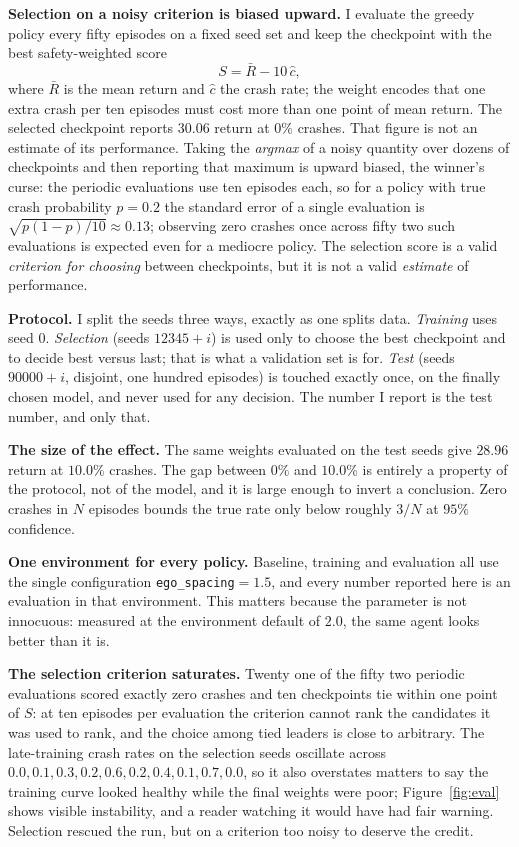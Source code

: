 \documentclass{article}
\newcommand{\agentmean}{28.96}
\newcommand{\agentcrash}{10.0}
\newcommand{\selmean}{30.06}
\newcommand{\selcrash}{0}
\begin{document}
\textbf{Selection on a noisy criterion is biased upward.} I evaluate the greedy policy every fifty episodes on a fixed seed set and keep the checkpoint with the best safety-weighted score
\begin{equation}
S=\bar R-10\,\hat c,
\label{eq:score}
\end{equation}
where $\bar R$ is the mean return and $\hat c$ the crash rate; the weight encodes that one extra crash per ten episodes must cost more than one point of mean return. The selected checkpoint reports $\selmean$ return at $\selcrash\%$ crashes. That figure is not an estimate of its performance. Taking the \emph{argmax} of a noisy quantity over dozens of checkpoints and then reporting that maximum is upward biased, the winner's curse: the periodic evaluations use ten episodes each, so for a policy with true crash probability $p{=}0.2$ the standard error of a single evaluation is $\sqrt{p(1-p)/10}\approx0.13$; observing zero crashes once across fifty two such evaluations is expected even for a mediocre policy. The selection score is a valid \emph{criterion for choosing} between checkpoints, but it is not a valid \emph{estimate} of performance.

\textbf{Protocol.} I split the seeds three ways, exactly as one splits data. \emph{Training} uses seed 0. \emph{Selection} (seeds $12345{+}i$) is used only to choose the best checkpoint and to decide best versus last; that is what a validation set is for. \emph{Test} (seeds $90000{+}i$, disjoint, one hundred episodes) is touched exactly once, on the finally chosen model, and never used for any decision. The number I report is the test number, and only that.

\textbf{The size of the effect.} The same weights evaluated on the test seeds give $\agentmean$ return at $\agentcrash\%$ crashes. The gap between $\selcrash\%$ and $\agentcrash\%$ is entirely a property of the protocol, not of the model, and it is large enough to invert a conclusion. Zero crashes in $N$ episodes bounds the true rate only below roughly $3/N$ at $95\%$ confidence.

\textbf{One environment for every policy.} Baseline, training and evaluation all use the single configuration \texttt{ego\_spacing}${=}1.5$, and every number reported here is an evaluation in that environment. This matters because the parameter is not innocuous: measured at the environment default of $2.0$, the same agent looks better than it is.

\textbf{The selection criterion saturates.} Twenty one of the fifty two periodic evaluations scored exactly zero crashes and ten checkpoints tie within one point of $S$: at ten episodes per evaluation the criterion cannot rank the candidates it was used to rank, and the choice among tied leaders is close to arbitrary. The late-training crash rates on the selection seeds oscillate across $0.0, 0.1, 0.3, 0.2, 0.6, 0.2, 0.4, 0.1, 0.7, 0.0$, so it also overstates matters to say the training curve looked healthy while the final weights were poor; Figure~\ref{fig:eval} shows visible instability, and a reader watching it would have had fair warning. Selection rescued the run, but on a criterion too noisy to deserve the credit.
\end{document}
